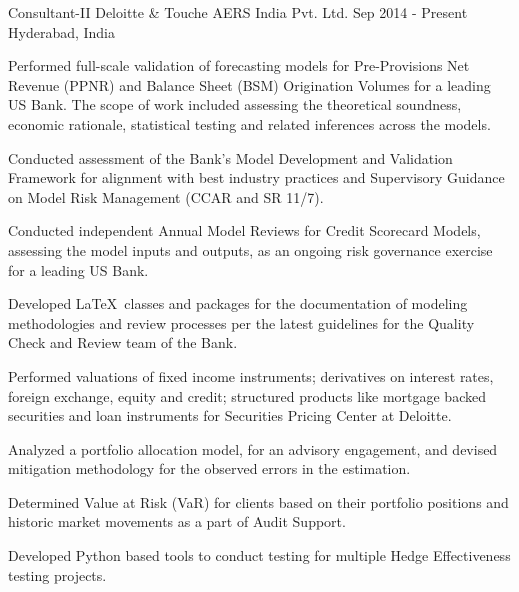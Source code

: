 \begin{cventries}
  \cventry
    {Consultant-II}
    {Deloitte \& Touche AERS India Pvt. Ltd.}
    {Sep 2014 - Present}
    {Hyderabad, India}
    {
      \begin{cvitems}
      	\item {Performed full-scale validation of forecasting models for Pre-Provisions Net Revenue (PPNR) and Balance Sheet (BSM) Origination Volumes for a leading US Bank. The scope of work included assessing the theoretical soundness, economic rationale, statistical testing and related inferences across the models.}
        \item {Conducted assessment of the Bank's Model Development and Validation Framework for alignment with best industry practices and Supervisory Guidance on Model Risk Management (CCAR and SR 11/7).}
        \item {Conducted independent Annual Model Reviews for Credit Scorecard Models, assessing the model inputs and outputs, as an ongoing risk governance exercise for a leading US Bank.}
        \item {Developed \LaTeX\  classes and packages for the documentation of modeling methodologies and review processes per the latest guidelines for the Quality Check and Review team of the Bank.}
        \item {Performed valuations of fixed income instruments; derivatives on interest rates, foreign exchange, equity and credit; structured products like mortgage backed securities and loan instruments for Securities Pricing Center at Deloitte.}
        \item {Analyzed a portfolio allocation model, for an advisory engagement, and devised mitigation methodology for the observed errors in the estimation.}
        \item {Determined Value at Risk (VaR) for clients based on their portfolio positions and historic market movements as a part of Audit Support.}
        \item {Developed Python based tools to conduct testing for multiple Hedge Effectiveness testing projects.}
      \end{cvitems} }

\end{cventries}
